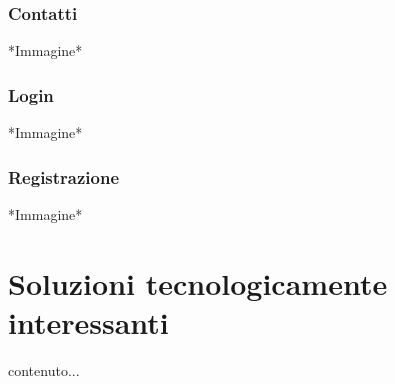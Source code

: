 \documentclass[12pt,a4paperS]{report}
\begin{document}
\begin{normalsize}
			\subsection{Contatti}
				*Immagine*
			
			\subsection{Login}
				*Immagine*
			
			\subsection{Registrazione}
				*Immagine*
	\end{normalsize}
	
	\hypertarget{soluzioni}{\chapter{Soluzioni tecnologicamente interessanti}}
	\label{soluzioni}
	\begin{normalsize}
		contenuto...
	\end{normalsize}
\end{document}
